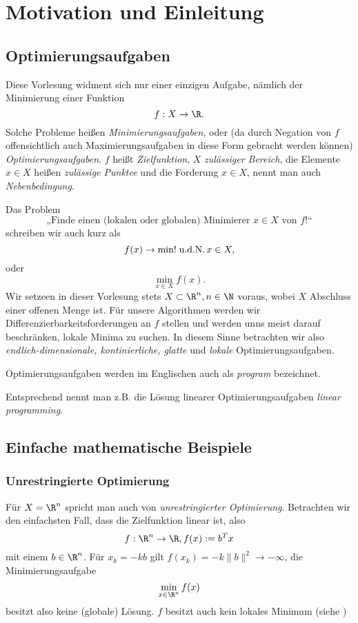 \chapter{Motivation und Einleitung}


\section{Optimierungsaufgaben}

Diese Vorlesung widment sich nur einer einzigen Aufgabe, nämlich der Minimierung einer Funktion
\[
	f : X \to \R.
\]
Solche Probleme heißen \emph{Minimierungsaufgaben}, oder (da durch Negation von $f$ offensichtlich auch Maximierungsaufgaben in diese Form gebracht werden können) \emph{Optimierungsaufgaben}.
$f$ heißt \emph{Zielfunktion}, $X$ \emph{zulässiger Bereich}, die Elemente $x \in X$ heißen \emph{zulässige Punktee} und die Forderung $x \in X$, nennt man auch \emph{Nebenbedingung}.

Das Problem
\[
	\text{„Finde einen (lokalen oder globalen) Minimierer $x\in X$ von $f$!“}
\]
schreiben wir auch kurz als
\[
	f(x) \to \min!
	\;\text{u.d.N.}\,
	x \in X,
\]
oder
\[
	\min_{x\in X} f(x).
\]
Wir setzeen in dieser Vorlesung stets $X \subset \R^n, n \in \N$ voraus, wobei $X$ Abschluss einer offenen Menge ist.
Für unsere Algorithmen werden wir Differenzierbarkeitsforderungen an $f$ stellen und werden unns meist darauf beschränken, lokale Minima zu suchen.
In diesem Sinne betrachten wir also \emph{endlich-dimensionale, kontinierliche, glatte} und \emph{lokale} Optimierungsaufgaben.

Optimierungsaufgaben werden im Englischen auch als \emph{program} bezeichnet.

Entsprechend nennt man z.B. die Lösung linearer Optimierungsaufgaben \emph{linear programming}.


\section{Einfache mathematische Beispiele}


\subsection{Unrestringierte Optimierung}

Für $X = \R^n$ spricht man auch von \emph{unrestringierter Optimierung}.
Betrachten wir den einfachsten Fall, dass die Zielfunktion linear ist, also
\[
	f : \R^n \to \R,
	f(x) := b^T x
\]
mit einem $b \in \R^n$.
Für $x_k = -kb$ gilt $f(x_k) = -k\|b\|^2 \to -\infty$, die Minimierungsaufgabe
\[
	\min_{x\in\R^n} f(x)
\]
besitzt also keine (globale) Lösung.
$f$ besitzt auch kein lokales Minimum (siehe )

